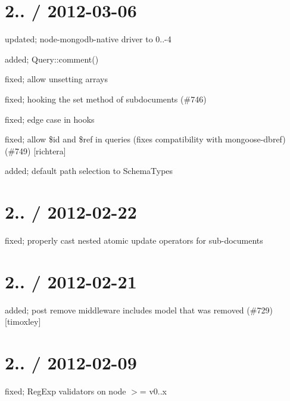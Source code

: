\section*{2.. / 2012-\/03-\/06 }


\begin{DoxyItemize}
\item updated; node-\/mongodb-\/native driver to 0..-\/4
\item added; Query\+::comment()
\item fixed; allow unsetting arrays
\item fixed; hooking the set method of subdocuments (\#746)
\item fixed; edge case in hooks
\item fixed; allow \$id and \$ref in queries (fixes compatibility with mongoose-\/dbref) (\#749) \mbox{[}richtera\mbox{]}
\item added; default path selection to Schema\+Types
\end{DoxyItemize}

\section*{2.. / 2012-\/02-\/22 }


\begin{DoxyItemize}
\item fixed; properly cast nested atomic update operators for sub-\/documents
\end{DoxyItemize}

\section*{2.. / 2012-\/02-\/21 }


\begin{DoxyItemize}
\item added; post \textquotesingle{}remove\textquotesingle{} middleware includes model that was removed (\#729) \mbox{[}timoxley\mbox{]}
\end{DoxyItemize}

\section*{2.. / 2012-\/02-\/09 }


\begin{DoxyItemize}
\item fixed; Reg\+Exp validators on node $>$= v0..\+x
\end{DoxyItemize}

